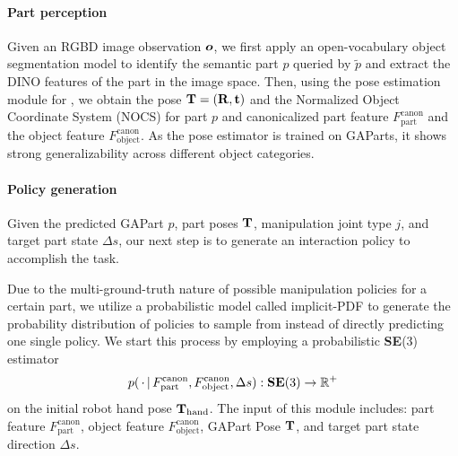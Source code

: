 \paragraph{Part perception}
Given an RGBD image observation ${\bm{o}}$, we first apply an open-vocabulary object segmentation model \cite{kirillov2023segany,liu2023grounding} to identify the semantic part $p$ queried by $\tilde{p}$ and extract the DINO features \cite{oquab2023dinov2} of the part in the image space.
Then, using the pose estimation module for \cite{geng2022gapartnet}, we obtain the pose ${\mathbf{T}} = ({\mathbf{R}}, {\mathbf{t}})$ and the Normalized Object Coordinate System (NOCS) for part $p$ and canonicalized part feature $F^{\text{canon}}_{\text{part}}$ and the object feature $F^{\text{canon}}_{\text{object}}$.
As the pose estimator is trained on GAParts, it shows strong generalizability across different object categories.



\paragraph{Policy generation}
Given the predicted GAPart $p$, part poses ${\mathbf{T}}$, manipulation joint type $j$, and target part state $\Delta s$, our next step is to generate an interaction policy to accomplish the task. 

Due to the multi-ground-truth nature of possible manipulation policies for a certain part, we utilize a probabilistic model called implicit-PDF \cite{implicitpdf2021} to generate the probability distribution of policies to sample from instead of directly predicting one single policy. We start this process by employing a probabilistic \textbf{SE}(3) estimator
\begin{equation*}
    p(\,\cdot\,|\, F^{\text{canon}}_{\text{part}}, F^{\text{canon}}_{\text{object}}, \Delta s):
    \textbf{SE}(3) \rightarrow \mathbb{R}^{+}
\end{equation*}
%
on the initial robot hand pose ${\mathbf{T}}_{\text{hand}}$. The input of this module includes: part feature $F^{\text{canon}}_{\text{part}}$, object feature $F^{\text{canon}}_{\text{object}}$, GAPart Pose ${\mathbf{T}}$, and target part state direction $\Delta s$. %

